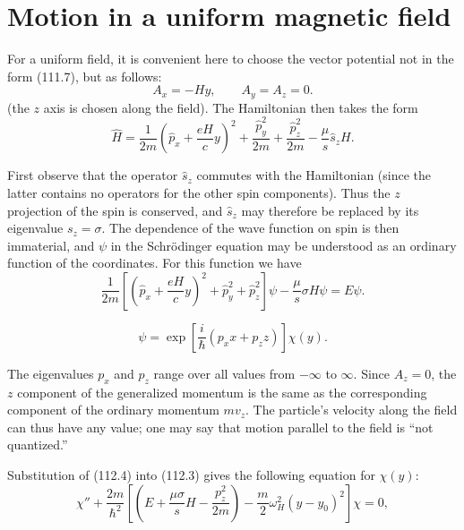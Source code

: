 \section{Motion in a uniform magnetic field}



For a uniform field, it is convenient here to choose the vector potential not in the form (111.7), but as follows:
\begin{equation}
 A_x=-Hy,\qquad A_y=A_z=0.
 \tag{112.1}
\end{equation}
(the $z$ axis is chosen along the field). The Hamiltonian then takes the form
\begin{equation}
 \hat H=\frac1{2m}\left(\hat p_x+\frac{eH}{c}y\right)^2+\frac{\hat p_y^2}{2m}+\frac{\hat p_z^2}{2m}-\frac\mu s\hat s_zH.
 \tag{112.2}
\end{equation}

First observe that the operator $\hat s_z$ commutes with the Hamiltonian (since the latter contains no operators for the other spin components). Thus the $z$ projection of the spin is conserved, and $\hat s_z$ may therefore be replaced by its eigenvalue $s_z=\sigma$. The dependence of the wave function on spin is then immaterial, and $\psi$ in the Schrödinger equation may be understood as an ordinary function of the coordinates. For this function we have
\begin{equation}
 \frac1{2m}\left[\left(\hat p_x+\frac{eH}{c}y\right)^2+\hat p_y^2+\hat p_z^2\right]\psi-\frac\mu s\sigma H\psi=E\psi.
 \tag{112.3}
\end{equation}


\begin{equation}
 \psi=\exp\left[\frac i\hbar(p_xx+p_zz)\right]\chi(y).
 \tag{112.4}
\end{equation}

The eigenvalues $p_x$ and $p_z$ range over all values from $-\infty$ to $\infty$. Since $A_z=0$, the $z$ component of the generalized momentum is the same as the corresponding component of the ordinary momentum $mv_z$. The particle's velocity along the field can thus have any value; one may say that motion parallel to the field is ``not quantized.''

Substitution of (112.4) into (112.3) gives the following equation for $\chi(y)$:
\begin{equation}
 \chi''+\frac{2m}{\hbar^2}\left[\left(E+\frac{\mu\sigma}{s}H-\frac{p_z^2}{2m}\right)-\frac m2\omega_H^2(y-y_0)^2\right]\chi=0,
 \tag{112.5}
\end{equation}

